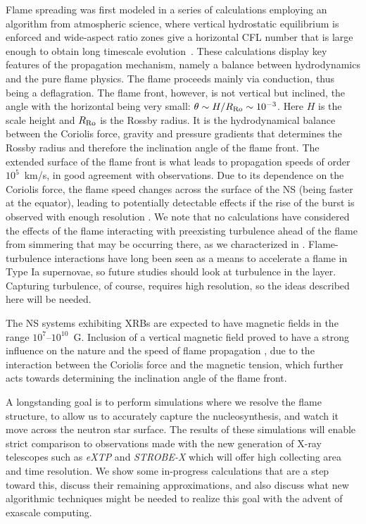 \documentclass[a4paper]{jpconf}
\begin{document}
Flame spreading was first modeled in a series of calculations
employing an algorithm from atmospheric science, where vertical
hydrostatic equilibrium is enforced and wide-aspect ratio zones give a
horizontal CFL number that is large enough to obtain long timescale
evolution~\cite{cavecchi:2012}.  These calculations display key
features of the propagation mechanism, namely a balance between
hydrodynamics and the pure flame physics. The flame proceeds mainly
via conduction, thus being a deflagration. The flame front, however,
is not vertical but inclined, the angle with the horizontal being very
small: $\theta \sim H/R_{\rm{Ro}} \sim 10^{-3}$. Here $H$ is the scale
height and $R_{\rm{Ro}}$ is the Rossby radius. It is the
hydrodynamical balance between the Coriolis force, gravity and
pressure gradients that determines the Rossby radius and therefore the
inclination angle of the flame front. The extended surface of the
flame front is what leads to propagation speeds of order $10^5 $~km/s,
in good agreement with observations. Due to its dependence on the
Coriolis force, the flame speed changes across the surface of the NS
(being faster at the equator), leading to potentially detectable
effects if the rise of the burst is observed with enough resolution
\cite{art-2015-cavecchi-etal}.  We note that no calculations have
considered the effects of the flame interacting with preexisting
turbulence ahead of the flame from simmering that may be occurring
there, as we characterized in \cite{xrb3}.  Flame-turbulence
interactions have long been seen as a means to accelerate a flame in
Type Ia supernovae, so future studies should look at turbulence in the
layer.  Capturing turbulence, of course, requires high resolution, so
the ideas described here will be needed.

The NS systems exhibiting XRBs are
expected to have magnetic fields in the range $10^7$--$10^{10}$~G.
Inclusion of a vertical magnetic field proved to have a strong
influence on the nature and the speed of flame propagation
\cite{art-2016-cavecchi-etal}, due to the interaction between the
Coriolis force and the magnetic tension, which further acts towards
determining the inclination angle of the flame front.

A longstanding goal is to perform simulations where we resolve the
flame structure, to allow us to accurately capture the
nucleosynthesis, and watch it move across the neutron star surface.
The results of these simulations will enable strict comparison to
observations made with the new generation of X-ray telescopes such as
\textit{eXTP}\/ and \textit{STROBE-X}\/
\cite{art-2017-wilhod-etal,art-2016-zhang-etal,intZand2018} which will offer
high collecting area and time resolution.
We show some in-progress calculations that are a step toward this, discuss
their remaining approximations, and also discuss what new algorithmic
techniques might be needed to realize this goal with the advent of
exascale computing.
\end{document}
